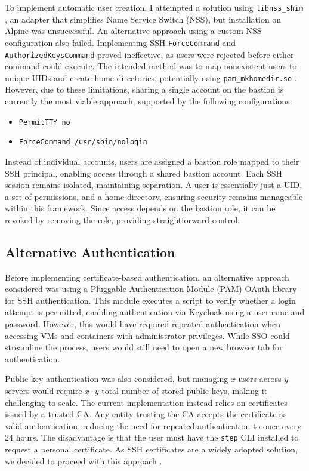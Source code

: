 To implement automatic user creation, I attempted a solution using \texttt{libnss\_shim} \parencite{libnss_shim}, an adapter that simplifies Name Service Switch (NSS), but installation on Alpine was unsuccessful. An alternative approach using a custom NSS configuration also failed. Implementing SSH \texttt{ForceCommand} and \texttt{AuthorizedKeysCommand} proved ineffective, as users were rejected before either command could execute. The intended method was to map nonexistent users to unique UIDs and create home directories, potentially using \texttt{pam\_mkhomedir.so} \parencite{pam_mkhomedir}. However, due to these limitations, sharing a single account on the bastion is currently the most viable approach, supported by the following configurations: 

\begin{itemize}
    \item \texttt{PermitTTY no}
    \item \texttt{ForceCommand /usr/sbin/nologin}
\end{itemize}

Instead of individual accounts, users are assigned a bastion role mapped to their SSH principal, enabling access through a shared bastion account. Each SSH session remains isolated, maintaining separation. A user is essentially just a UID, a set of permissions, and a home directory, ensuring security remains manageable within this framework. Since access depends on the bastion role, it can be revoked by removing the role, providing straightforward control.

\subsection{Alternative Authentication}
Before implementing certificate-based authentication, an alternative approach considered was using a Pluggable Authentication Module (PAM) OAuth library for SSH authentication. This module executes a script to verify whether a login attempt is permitted, enabling authentication via Keycloak using a username and password. However, this would have required repeated authentication when accessing VMs and containers with administrator privileges. While SSO could streamline the process, users would still need to open a new browser tab for authentication. 

Public key authentication was also considered, but managing $x$ users across $y$ servers would require $x \cdot y$ total number of stored public keys, making it challenging to scale. The current implementation instead relies on certificates issued by a trusted CA. Any entity trusting the CA accepts the certificate as valid authentication, reducing the need for repeated authentication to once every 24 hours. The disadvantage is that the user must have the \texttt{step} CLI installed to request a personal certificate. As SSH certificates are a widely adopted solution, we decided to proceed with this approach \parencite{smallstep_ssh_certificates}.

